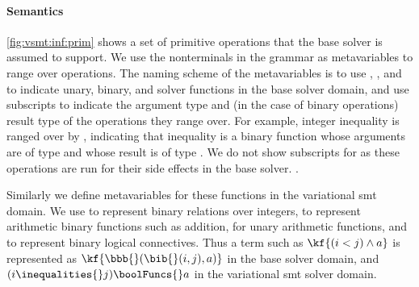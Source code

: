 \paragraph{Semantics}
%
\autoref{fig:vsmt:inf:prim} shows a set of primitive operations that the base
solver is assumed to support. We use the nonterminals in the grammar as
metavariables to range over operations. The naming scheme of the metavariables
is to use \uop{}, \bop{}, and \sop{} to indicate unary, binary, and solver
functions in the base solver domain, and use subscripts to indicate the
argument type and (in the case of binary operations) result type of the
operations they range over.
%
For example, integer inequality is ranged over by \bib{}, indicating that
inequality is a binary function whose arguments are of type \integers{} and
whose result is of type \booleans{}.
%
We do not show subscripts for \sop{} as these operations are run for their side
effects in the base solver.
%
.

%
%
Similarly we define metavariables for these
functions in the variational \ac{smt} domain. We use \inequalities{} to
represent binary relations over integers, \integerFuncs{} to represent
arithmetic binary functions such as addition, \integerUnary{} for unary
arithmetic functions, and \boolFuncs{} to represent binary logical connectives.
Thus a term such as $\kf{(i < j) \wedge a}$ is represented as
$\kf{\bbb{}(\bib{}(i,j),a)}$ in the base solver domain, and $(i \inequalities{}
j) \boolFuncs{} a$ in the variational \ac{smt} solver domain.





